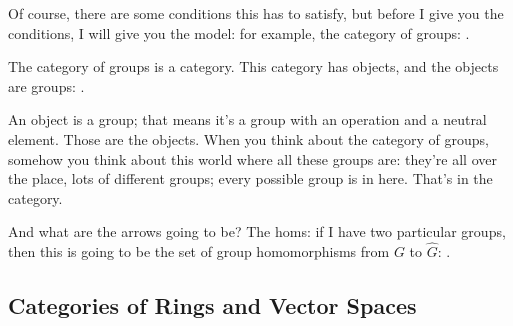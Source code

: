 \begin{speech}[01:07:57 - 01:09:08]
Of course, there are some conditions this has to satisfy, but before I give you the conditions, I will give you the model: for example, the category of groups: .

The category of groups is a category. This category has objects,  and the objects are groups: .

An object is a group; that means it's a group with an operation and a neutral element. Those are the objects. When you think about the category of groups, somehow you think about this world where all these groups are: they're all over the place, lots of different groups; every possible group is in here. That's in the category.

And what are the arrows going to be? The homs: if I have two particular groups,  then this is going to be the set of group homomorphisms  from $G$ to $\hat{G}$: .
\end{speech}

\begin{content}
\end{content}

\subsection{Categories of Rings and Vector Spaces}

